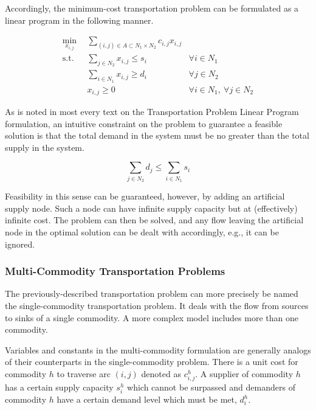 Accordingly, the minimum-cost transportation problem can be formulated as a
linear program in the following manner.

\begin{subequations}\label{eqs:xport}
  \begin{align}
    \min_{x_{i,j}} \:\: & 
    \sum_{(i, j) \in A \subset N_1 \times N_2} c_{i,j} x_{i,j}
    & \label{eqs:xport_obj} \\
    \text{s.t.} \:\: &
    \sum_{j \in N_2} x_{i,j} \leq s_i
    & \forall i \in N_1  \\
    &
    \sum_{i \in N_1} x_{i,j} \geq d_i
    & \forall j \in N_2  \\
    &
    x_{i,j} \geq 0
    & \forall i \in N_1, \: \forall j \in N_2 \label{eqs:xport_x}
  \end{align}
\end{subequations}

As is noted in most every text on the Transportation Problem Linear Program
formulation, an intuitive constraint on the problem to guarantee a feasible
solution is that the total demand in the system must be no greater than the
total supply in the system.

\begin{equation}
  \sum_{j \in N_2} d_j \leq \sum_{i \in N_1} s_i
\end{equation}

Feasibility in this sense can be guaranteed, however, by adding an artificial
supply node. Such a node can have infinite supply capacity but at (effectively)
infinite cost. The problem can then be solved, and any flow leaving the
artificial node in the optimal solution can be dealt with accordingly, e.g., it
can be ignored.

\subsubsection{Multi-Commodity Transportation Problems}\label{sec:MCTP}
The previously-described transportation problem can more precisely be named the
single-commodity transportation problem. It deals with the flow from sources to
sinks of a single commodity. A more complex model includes more than one
commodity.

Variables and constants in the multi-commodity formulation are generally analogs
of their counterparts in the single-commodity problem. There is a unit cost for
commodity $h$ to traverse arc $(i,j)$ denoted as $c_{i,j}^{h}$. A supplier of
commodity $h$ has a certain supply capacity $s_i^h$ which cannot be surpassed
and demanders of commodity $h$ have a certain demand level which must be met,
$d_i^h$.

